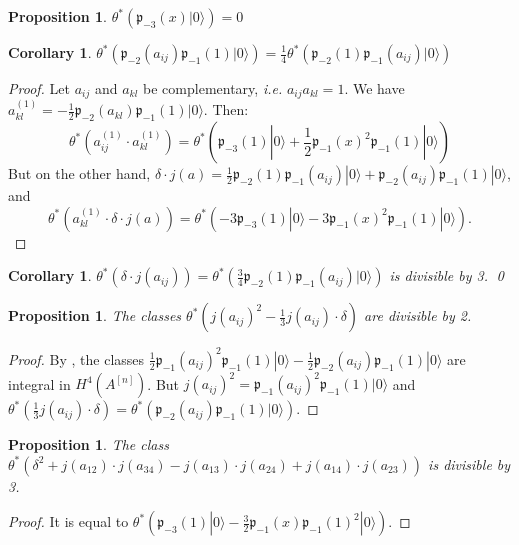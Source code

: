 \documentclass{amsart}
\newcommand{\hilb}[1]{^{[#1]}}
\newcommand{\ie}{{\it i.e. }}
\newcommand{\vac}{|0\rangle}
\newcommand{\p}{\mathfrak{p}}
\newcommand{\pone}{ \mathfrak{p}_{ - 1} }
\theoremstyle{plain}
\newtheorem{proposition}[theorem]{Proposition}
\newtheorem{corollary}[theorem]{Corollary}
\theoremstyle{definition}
\theoremstyle{remark}
\begin{document}
\begin{proposition}
$\theta^*\left(\p_{-3}(x)\vac\right) =0$ 
\end{proposition}
\begin{corollary}
$\theta^* \left(\p_{-2}(a_{ij})\pone(1)\vac\right) = \frac{1}{4}\theta^*\left( \p_{-2}(1)\pone(a_{ij})\vac\right) $
\end{corollary}
\begin{proof}
Let  $a_{ij}$ and $a_{kl}$ be complementary, \ie $a_{ij}a_{kl}=1$. We have $a_{kl}^{(1)} = -\frac{1}{2} \p_{-2}(a_{kl})\pone(1)\vac$. Then:
$$
\theta^*\left(a_{ij}^{(1)}\cdot a_{kl}^{(1)} \right) =
\theta^*\left(\p_{-3}(1)\vac + \frac{1}{2}\pone(x)^2\pone(1)\vac \right)
$$
But on the other hand, $\delta \cdot j(a) = \frac{1}{2} \p_{-2}(1)\pone(a_{ij})\vac+\p_{-2}(a_{ij})\pone(1)\vac$, and
$$
\theta^*\left(a_{kl}^{(1)} \cdot \delta \cdot j(a)\right) =
\theta^*\left(-3\p_{-3}(1)\vac  - 3\pone(x)^2\pone(1)\vac \right).
$$
\end{proof}
\begin{corollary}
$\theta^*\left( \delta \cdot j(a_{ij}) \right) = \theta^*\left( \frac{3}{4} \p_{-2}(1)\pone(a_{ij})\vac\right)$ is divisible by 3. \qed
\end{corollary}
\begin{proposition}
The classes $\theta^*\left(j(a_{ij})^2 - \frac{1}{3}j(a_{ij})\cdot \delta\right)$ are divisible by 2.
\end{proposition}
\begin{proof}
By \cite{QinWang}, the classes $\frac{1}{2} \pone(a_{ij})^2\pone(1)\vac - \frac{1}{2}\p_{-2}(a_{ij})\pone(1)\vac$ are integral in $H^4(A\hilb{n})$. But $j(a_{ij})^2= \pone(a_{ij})^2\pone(1)\vac $ and $\theta^*\left(\frac{1}{3}j(a_{ij})\cdot\delta\right) =\theta^*\left(\p_{-2}(a_{ij})\pone(1)\vac\right)$.
\end{proof}


\begin{proposition}\label{DelSum3}
The class $\theta^*\left(\delta^2+j(a_{12})\cdot j(a_{34})-j(a_{13})\cdot j(a_{24})+j(a_{14})\cdot j(a_{23})\right)$ is divisible by 3.
\end{proposition}
\begin{proof}
It is equal to $\theta^*\left(\p_{-3}(1)\vac -\frac{3}{2}\pone(x)\pone(1)^2\vac \right)$.
\end{proof}
\end{document}
